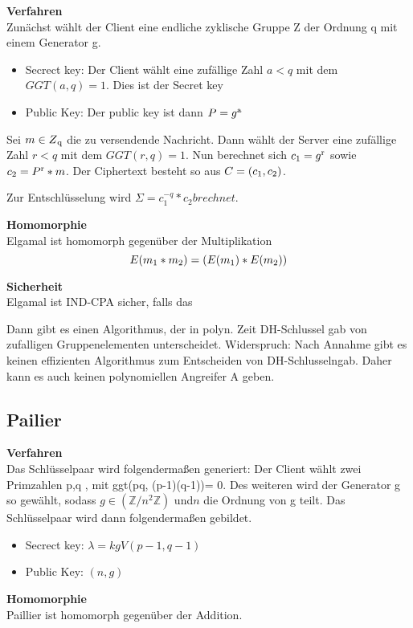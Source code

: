 \textbf{Verfahren}\\

Zunächst wählt der Client eine endliche zyklische Gruppe Z der Ordnung q mit einem Generator g.
\begin{itemize}	
	\item Secrect key: Der Client wählt eine zufällige Zahl $a<q$ mit dem $GGT(a,q) = 1$. Dies ist der Secret key
	\item Public Key: Der public key ist dann $P = g\textsuperscript{a} $	
\end{itemize}

Sei $m \in Z\textsubscript{q}$ die zu versendende Nachricht. Dann wählt der Server eine zufällige Zahl $r<q$ mit dem $GGT(r,q) = 1$. Nun berechnet sich $c\textsubscript{1} = g\textsuperscript{r}$ sowie $c\textsubscript{2} =P \textsuperscript{r} *m$. Der Ciphertext besteht so aus $C = (c\textsubscript{1},c\textsubscript{2})$.

Zur Entschlüsselung wird $\Sigma = c_{1}^{-q} * c_{2} brechnet.$

\textbf{Homomorphie}\\
Elgamal ist homomorph gegenüber der Multiplikation
$$ E(m \textsubscript{1} * m \textsubscript{2}) = (E(m \textsubscript{1}) * E(m \textsubscript{2}))$$

\textbf{Sicherheit}\\
Elgamal ist IND-CPA sicher, falls das



Dann gibt es einen Algorithmus, der in polyn. Zeit DH-Schlussel gab von zufalligen Gruppenelementen unterscheidet.
Widerspruch:
Nach Annahme gibt es keinen effizienten
Algorithmus zum Entscheiden von DH-Schlusselngab.
Daher kann es auch keinen polynomiellen Angreifer A geben.



\subsection{Pailier}
\label{sec:Sec1.3.2}

\textbf{Verfahren}\\
Das Schlüsselpaar wird folgendermaßen generiert:
Der Client wählt zwei Primzahlen p,q , mit ggt(pq, (p-1)(q-1))= 0. Des weiteren wird der Generator g so gewählt, sodass $ g \in (\mathbb{Z}/ n^{2} \mathbb{Z}) $ und$ n $ die Ordnung von g teilt.
Das Schlüsselpaar wird dann folgendermaßen gebildet.
\begin{itemize}	
	\item Secrect key: $ \lambda = kgV(p-1, q-1) $
	\item Public Key: $(n,g)$	
\end{itemize}
\textbf{Homomorphie}\\
Paillier ist homomorph gegenüber der Addition.

